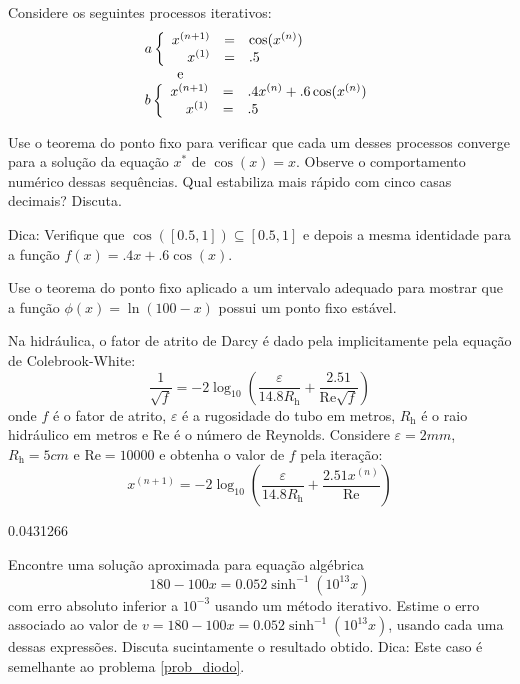 \documentclass[main.tex]{subfiles}
\begin{document}
\begin{Exercise} Considere os seguintes processos iterativos:
\begin{equation}
\begin{array}{l}
a\left\{\begin{array}{rcl}
x^{(n+1)}&=&\cos(x^{(n)})\\
x^{(1)}&=&.5
\end{array}
\right. \\ \qquad \hbox { e }\\
b\left\{\begin{array}{rcl}
x^{(n+1)}&=&.4x^{(n)}+.6\cos(x^{(n)})\\
x^{(1)}&=&.5
\end{array}
\right.
\end{array}
\end{equation}

Use o teorema do ponto fixo para verificar que cada um desses processos converge para a solução da equação $x^*$ de $\cos(x)=x$. Observe o comportamento numérico dessas sequências. Qual estabiliza mais rápido com cinco casas decimais? Discuta.

Dica: Verifique que $\cos([0.5,1])\subseteq [0.5,1]$ e depois a mesma identidade para a função $f(x)=.4x+.6\cos(x)$.
\end{Exercise}


\begin{Exercise}  Use o teorema do ponto fixo aplicado a um intervalo adequado para mostrar que a função $\phi(x)=\ln (100-x)$ possui um ponto fixo estável.
\end{Exercise}

\begin{Exercise}[title=Fluidos] Na hidráulica, o fator de atrito de Darcy é dado pela implicitamente pela equação de Colebrook-White:
$$\frac{1}{\sqrt{f}}= -2 \log_{10} \left( \frac{\varepsilon}{14.8 R_\mathrm{h}} + \frac{2.51}{\mathrm{Re}\sqrt{f}} \right)$$
onde $f$ é o fator de atrito, $\varepsilon$ é a rugosidade do tubo em metros, $R_\mathrm{h}$ é o raio hidráulico em metros e $\mathrm{Re}$ é o número de Reynolds. Considere $\varepsilon=2mm$, $R_\mathrm{h}=5cm$ e $\mathrm{Re}=10000$ e obtenha o valor de $f$ pela iteração:
$$x^{(n+1)}=-2 \log_{10} \left( \frac{\varepsilon}{14.8 R_\mathrm{h}} + \frac{2.51x^{(n)}}{\mathrm{Re}} \right)$$
\end{Exercise}
\begin{Answer}
0.0431266
\end{Answer}

\begin{Exercise} Encontre uma solução aproximada para equação algébrica
$$180-100x=0.052\sinh^{-1}(10^{13}x)$$
com erro absoluto inferior a $10^{-3}$ usando um método iterativo.
Estime o erro associado ao valor de $v=180-100x=0.052\sinh^{-1}(10^{13}x)$, usando cada uma dessas expressões. Discuta sucintamente o resultado obtido. Dica: Este caso é semelhante ao problema \ref{prob_diodo}.
\end{Exercise}
\end{document}
